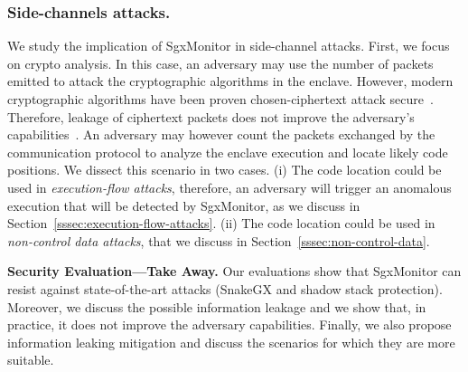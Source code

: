 \subsubsection{Side-channels attacks.}
\label{sssec:info-leakage}

We study the implication of SgxMonitor in side-channel attacks.
First, we focus on crypto analysis. In this case, an adversary may use the 
number of packets emitted to attack the cryptographic algorithms in the 
enclave. However, 
modern cryptographic algorithms have been proven chosen-ciphertext attack 
secure~\citep{barthe2011beyond}. Therefore, leakage of ciphertext packets does 
not improve the adversary's capabilities~\citep{wee2010efficient}. 
%
An adversary may however count the packets exchanged by the communication 
protocol to analyze the enclave execution and locate likely code
positions. 
We dissect this scenario in two cases.
(i) The code location could be used in \emph{execution-flow attacks}, 
therefore, an adversary will trigger an anomalous execution that will be 
detected by SgxMonitor, as we discuss in 
Section~\ref{sssec:execution-flow-attacks}.
(ii) The code location could be used in \emph{non-control data attacks}, that 
we discuss in Section~\ref{sssec:non-control-data}.

\vspace{0.5cm}
\noindent \textbf{Security Evaluation---Take Away.}
Our evaluations show that SgxMonitor can resist against state-of-the-art 
attacks (\ie \textsf{SnakeGX} and shadow stack protection).
Moreover, we discuss the possible information leakage and we show that, in 
practice, it does not improve the adversary capabilities.
Finally, we also propose information leaking mitigation and discuss the 
scenarios for which they are more suitable.